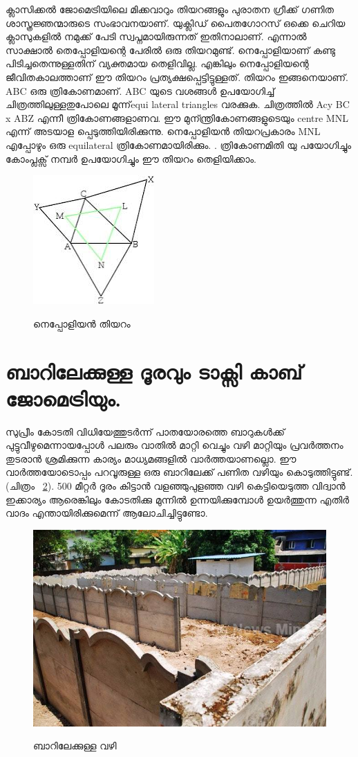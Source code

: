 \documentclass[10pt,a4paper]{report}
\begin{document}
  ക്ലാസിക്കൽ ജോമെട്രിയിലെ മിക്കവാറും തിയറങ്ങളും പുരാതന ഗ്രീക്ക് ഗണിത ശാസ്ത്രജ്ഞന്മാരുടെ സംഭാവനയാണ്. യുക്ലിഡ് പൈതഗോറസ് ഒക്കെ ചെറിയ ക്ലാസുകളിൽ നമുക്ക് പേടി സ്വപ്നമായിരുന്നത് ഇതിനാലാണ്. എന്നാൽ സാക്ഷാൽ തെപ്പോളിയന്റെ പേരിൽ ഒരു തിയറമുണ്ട്. നെപ്പോളിയാണ് കണ്ടു പിടിച്ചതെന്നുള്ളതിന് വ്യക്തമായ തെളിവില്ല. എങ്കിലും നെപ്പോളിയന്റെ ജീവിതകാലത്താണ് ഈ തിയറം പ്രത്യക്ഷപ്പെട്ടിട്ടുള്ളത്. തിയറം ഇങ്ങനെയാണ്. ABC ഒരു ത്രികോണമാണ്‌. ABC യുടെ വശങ്ങൾ ഉപയോഗിച്ച് ചിത്രത്തിലുള്ളതുപോലെ മൂന്ന്equi lateral triangles വരക്കുക. ചിത്രത്തിൽ Acy BC x ABZ എന്നീ ത്രികോണങ്ങളാണവ. ഈ മുന്ന്ത്രികോണങ്ങളുടെയും centre MNL എന്ന് അടയാള പ്പെടുത്തിയിരിക്കുന്നു. നെപ്പോളിയൻ തിയറപ്രകാരം MNL എപ്പോഴും ഒരു equilateral ത്രികോണമായിരിക്കും. . ത്രികോണമിതി യു പയോഗിച്ചും കോംപ്ലക്സ് നമ്പർ ഉപയോഗിച്ചും ഈ തിയറം തെളിയിക്കാം. 

  \begin{figure}[H]
  \center
\includegraphics[scale=.7]{images/nap}
\label{nap}
\caption{  നെപ്പോളിയൻ തിയറം }
\end{figure}
\section{ബാറിലേക്കുള്ള ദൂരവും ടാക്സി കാബ് ജോമെട്രിയും.}
സുപ്രീം കോടതി വിധിയേത്തുടർന്ന് പാതയോരത്തെ ബാറുകൾക്ക് പുട്ടുവീഴുമെന്നായപ്പോൾ പലരും വാതിൽ മാറ്റി വെച്ചും വഴി മാറ്റിയും പ്രവർത്തനം തുടരാൻ ശ്രമിക്കുന്ന കാര്യം മാധ്യമങ്ങളിൽ വാർത്തയാണല്ലൊ. ഈ വാർത്തയോടൊപ്പം പറവൂരുള്ള ഒരു ബാറിലേക്ക് പണിത വഴിയും കൊടുത്തിട്ടുണ്ട്. (ചിത്രം ~\ref{bar1}). 500 മീറ്റർ ദൂരം കിട്ടാൻ വളഞ്ഞുപുളഞ്ഞ വഴി കെട്ടിയെടുത്ത വിദ്വാൻ ഇക്കാര്യം ആരെങ്കിലും കോടതിക്കു മുന്നിൽ ഉന്നയിക്കുമ്പോൾ ഉയർത്തുന്ന എതിർ  വാദം എന്തായിരിക്കുമെന്ന് ആലോചിച്ചിട്ടുണ്ടോ. 
 

 \begin{figure}[H]
  \center
\includegraphics[scale=.25]{images/bar1}
\label{bar1}
\caption{   ബാറിലേക്കുള്ള വഴി }
\end{figure}
\end{document}

